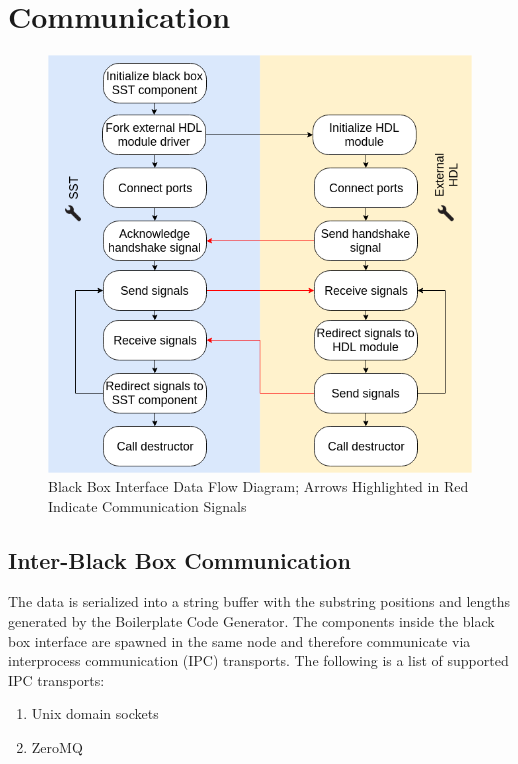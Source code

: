\documentclass{article}
\begin{document}
  \section{Communication}

  \begin{figure}[!h]
    \centering
    \includegraphics[width=5in]{diagrams/data_flow.png}
    \caption{Black Box Interface Data Flow Diagram; Arrows Highlighted in Red Indicate
    Communication Signals}
    \label{fig:data_flow}
  \end{figure}

    \subsection{Inter-Black Box Communication} \label{sec:ipc}
    The data is serialized into a string buffer with the substring positions and lengths generated
    by the Boilerplate Code Generator. The components inside the black box interface are spawned in
    the same node and therefore communicate via interprocess communication (IPC) transports. The
    following is a list of supported IPC transports:
    \begin{enumerate}
      \item Unix domain sockets
      \item ZeroMQ
    \end{enumerate}
\end{document}
